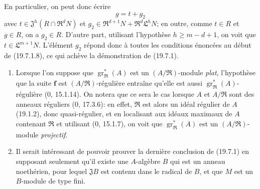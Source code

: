 
En particulier, on peut donc écrire
\[
  g=t+g_2
\]
avec $t\in\mathfrak J^h(R\cap\mathfrak R^dN)$ et $g_2\in\mathfrak R^{d+1}N+\mathfrak R^d\mathfrak L^hN$; en outre, comme $t\in R$ et $g\in R$, on a $g_2\in R$. D'autre part, utilisant l'hypothèse $h\geq m-d+1$, on voit que $t\in\mathfrak L^{m+1}N$. L'élément $g_2$ répond donc à toutes les conditions énoncées au début de (19.7.1.8), ce qui achève la démonstration de (19.7.1).

\begin{remarks}[19.7.2]
\label{IV.19.7.2}
\begin{enumerate}
  \item[(i)] Lorsque l'on suppose que $\operatorname{gr}_{\mathfrak R}^*(A)$ est un $(A/\mathfrak R)$-module \emph{plat}, l'hypothèse que la suite $\mathbf f$ est $(A/\mathfrak R)$-régulière entraîne qu'elle est aussi $\operatorname{gr}_{\mathfrak R}^*(A)$-régulière ($0$, 15.1.14). On notera que ce sera le cas lorsque $A$ et $A/\mathfrak R$ sont des anneaux réguliers ($0$, 17.3.6): en effet, $\mathfrak R$ est alors un idéal régulier de $A$ (19.1.2), donc quasi-régulier, et en localisant aux idéaux maximaux de $A$ contenant $\mathfrak R$ et utilisant ($0$, 15.1.7), on voit que $\operatorname{gr}_{\mathfrak R}^*(A)$ est un $(A/\mathfrak R)$-module \emph{projectif}.
  \item[(ii)] Il serait intéressant de pouvoir prouver la dernière conclusion de (19.7.1) en supposant seulement qu'il existe une $A$-algèbre $B$ qui est un anneau noethérien, pour lequel $\mathfrak JB$ est contenu dans le radical de $B$, et que $M$ est un $B$-module de type fini.
\end{enumerate}
\end{remarks}

